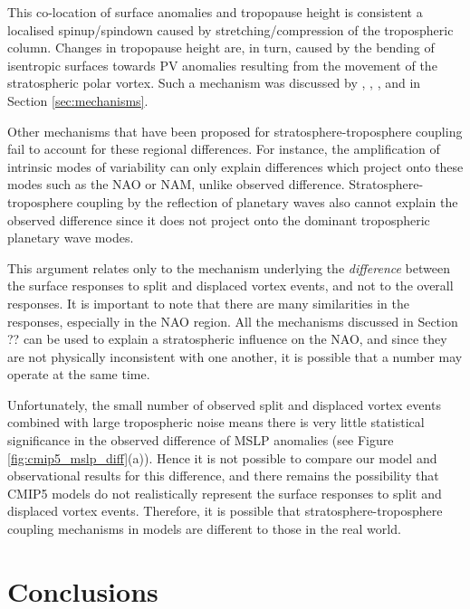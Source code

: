 This co-location of surface anomalies and tropopause height is consistent a
localised spinup/spindown caused by stretching/compression of the tropospheric
column. Changes in tropopause height are, in turn, caused by the bending of
isentropic surfaces towards PV anomalies resulting from the movement of the
stratospheric polar vortex. Such a mechanism was discussed by
\citet{Hartley1998}, \citet{Ambaum2002}, \citet{Black2002}, and in Section
\ref{sec:mechanisms}.  

Other mechanisms that have been proposed for stratosphere-troposphere coupling
fail to account for these regional differences. For instance, the amplification
of intrinsic modes of variability \citep{Robinson1991} can only explain
differences which project onto these modes such as the NAO or NAM, unlike
observed difference. Stratosphere-troposphere coupling by the reflection of
planetary waves \citep{JudithPerlwitz2003,Shaw2010} also cannot explain the
observed difference since it  does not project onto the dominant tropospheric
planetary wave modes. 

This argument relates only to the mechanism underlying the \emph{difference}
between the surface responses to split and displaced vortex events, and not to
the overall responses. It is important to note that there are many similarities
in the responses, especially in the NAO region. All the mechanisms discussed in
Section ?? can be used to explain a stratospheric influence on the NAO, and
since they are not physically inconsistent with one another, it is possible that
a number may operate at the same time. 

Unfortunately, the small number of observed split and displaced vortex events
combined with large tropospheric noise means there is very little statistical
significance in the observed difference of MSLP anomalies (see Figure
\ref{fig:cmip5_mslp_diff}(a)). Hence it is not possible to compare our model and
observational results for this difference, and there remains the
possibility that CMIP5 models do not realistically represent the surface
responses to split and displaced vortex events. Therefore, it is possible that
stratosphere-troposphere coupling mechanisms in models are different to those in
the real world. 

\section{Conclusions}

